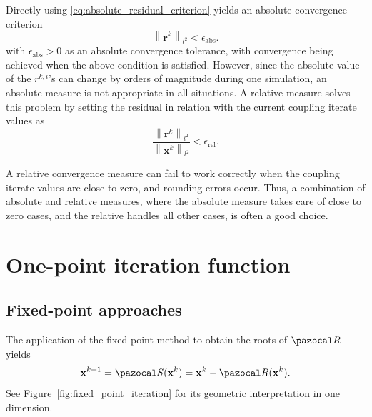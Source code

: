 Directly using \eqref{eq:absolute_residual_criterion} yields an absolute convergence criterion
\begin{equation}
\left\|\boldsymbol{r} ^{k}\right\|_{l^{2}}<\epsilon_\mathrm{abs}.
\end{equation}
with $\epsilon_\mathrm{abs}>0$ as an absolute convergence tolerance, with convergence being achieved when the above condition is satisfied.
However, since the absolute value of the $r^{k, i} $'s can change by orders of magnitude during one simulation, an absolute measure is not appropriate in all situations.
A relative measure solves this problem by setting the residual in relation with the current coupling iterate values as
\begin{equation}
\frac{\left\|\mathbf{r}^{k}\right\|_{l^{2}}}{\left\|\mathbf{x}^{k}\right\|_{l^{2}}}<\epsilon_\mathrm{rel}.
\end{equation}

A relative convergence measure can fail to work correctly when the coupling iterate values are close to zero, and rounding errors occur.
Thus, a combination of absolute and relative measures, where the absolute measure takes care of close to zero cases, and the relative handles all other cases, is often a good choice.



\section{One-point iteration function} \label{sec:one_point_iteration_function}

\subsection{Fixed-point approaches} \label{sec:fixed_point_approach}

The application of the fixed-point method to obtain the roots of \(\pazocal R\) yields
\begin{equation}
  \mathbf x^{k+1} = \pazocal S(\mathbf x^k) = \mathbf x^k - \pazocal R(\mathbf x^k).
\end{equation}
See Figure~\ref{fig:fixed_point_iteration} for its geometric interpretation in one dimension.

